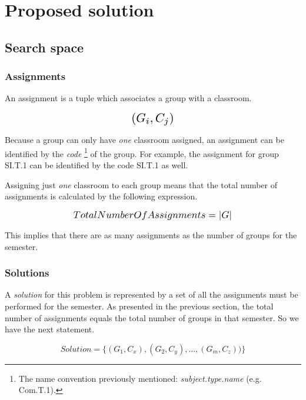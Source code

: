 \renewcommand{\documentname}{Proposed solution}

\chapter{Proposed solution}


\section{Search space}


\subsection{Assignments}

An assignment is a tuple which associates a group with a classroom.

\begin{equation}
    \scalebox{1.5}{$(G_{i}, C_{j})$}
\end{equation}

Because a group can only have \textit{one} classroom assigned, an assignment can be identified by the \textit{code} \footnote{The name convention previously mentioned: \textit{subject.type.name} (e.g. Com.T.1).} of the group. For example, the assignment for group SI.T.1 can be identified by the code SI.T.1 as well.

Assigning just \textit{one} classroom to each group means that the total number of assignments is calculated by the following expression.

\begin{equation}
    \scalebox{1.2}{$TotalNumberOfAssignments = \left|G\right|$}
\end{equation}

This implies that there are as many assignments as the number of groups for the semester.

\subsection{Solutions}

A \textit{solution} for this problem is represented by a set of all the assignments must be performed for the semester. As presented in the previous section, the total number of assignments equals the total number of groups in that semester. So we have the next statement.

\begin{equation}
    Solution = \{ (G_{1}, C_{x}), (G_{2}, C_{y}), ..., (G_{m}, C_{z})) \}
\end{equation}

